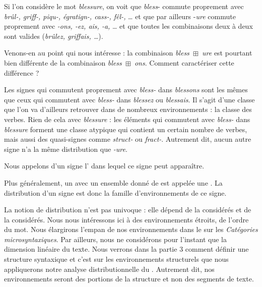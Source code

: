 Si l’on considère le mot \textit{blessure}, on voit que \textit{bless}{}- commute proprement avec \textit{brûl-, griff-, piqu-, égratign-, cass-, fêl-,} … et que par ailleurs -\textit{ure} commute proprement avec \textit{{}-ons, -ez, ais, -a,} … et que toutes les combinaisons deux à deux sont valides (\textit{brûlez, griffais, …}).

Venons-en au point qui nous intéresse : la combinaison \textit{bless~}${\boxplus}$\textit{~ure} est pourtant bien différente de la combinaison \textit{bless~}${\boxplus}$\textit{~ons}. Comment caractériser cette différence ?

Les signes qui commutent proprement avec \textit{bless-} dans \textit{blessons} sont les mêmes que ceux qui commutent avec \textit{bless-} dans \textit{blessez} ou \textit{blessais}. Il s’agit d’une classe que l’on va d’ailleurs retrouver dans de nombreux environnements : la classe des verbes. Rien de cela avec \textit{blessure} : les éléments qui commutent avec \textit{bless-} dans \textit{blessure} forment une classe atypique qui contient un certain nombre de verbes, mais aussi des quasi-signes comme \textit{struct-} ou \textit{fract-}. Autrement dit, aucun autre signe n’a la même distribution que \textit{{}-ure}.

{Nous appelons  d’un signe l’ dans lequel ce signe peut apparaître.}

{Plus généralement, un   avec un ensemble donné de  est appelée une . La distribution d’un signe est donc la famille d’environnements de ce signe.}

La notion de distribution n’est pas univoque : elle dépend de la  considérés et de la  considérés. Nous nous intéressons ici à des environnements étroits, de l’ordre du mot. Nous élargirons l’empan de nos environnements dans le  sur les \textit{Catégories microsyntaxiques}. Par ailleurs, nous ne considérons pour l’instant que la dimension linéaire du texte. Nous verrons dans la partie 3 comment définir une structure syntaxique et c’est sur les environnements structurels que nous appliquerons notre analyse distributionnelle du . Autrement dit, nos environnements seront des portions de la structure et non des segments de texte.

